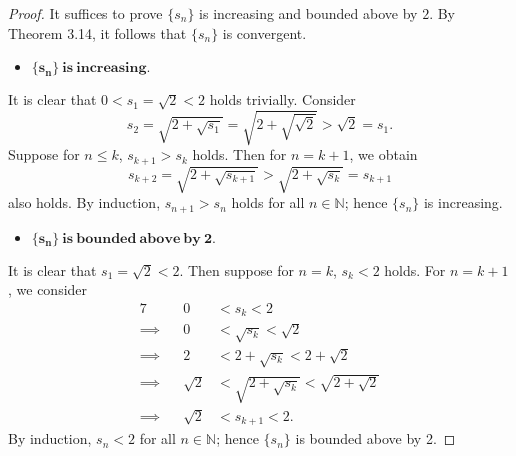 \begin{Exercise}
	\begin{proof}
		It suffices to prove $\{s_n\}$ is increasing and bounded above by $2$. By Theorem 3.14, it follows that $\{s_n\}$ is convergent.
		
		\begin{itemize}
			\item $\mathbf{\{s_n\}\ is\ increasing.}$ 
		\end{itemize}
		It is clear that $0<s_1=\sqrt{2}<2$ holds trivially.
		Consider
		$$
		s_2 = \sqrt{2+\sqrt{s_1}} = \sqrt{2+\sqrt{\sqrt{2}}} > \sqrt{2} = s_1.
		$$
		Suppose for $n\leq k$, $s_{k+1}>s_k$ holds. Then for $n = k+1$, we obtain
		$$
		s_{k+2} = \sqrt{2+\sqrt{s_{k+1}}} > \sqrt{2+\sqrt{s_k}} = s_{k+1}
		$$
		also holds. By induction, $s_{n+1}>s_n$ holds for all $n\in\mathbb{N}$; hence $\{s_n\}$ is increasing.
		
		\begin{itemize}
			\item $\mathbf{\{s_n\}\ is\ bounded\ above\ by\ 2.}$ 
		\end{itemize}
		It is clear that $s_1 = \sqrt{2} < 2$. Then suppose for $n=k$, $s_k < 2$ holds. For $n=k+1$, we consider
		\begin{alignat*}{7}
		\quad&& 0 &<s_k<2 \\
		\implies&& 0 &< \sqrt{s_k} < \sqrt{2} \\
		\implies&& 2 &< 2+\sqrt{s_k} < 2+\sqrt{2} \\
		\implies&& \sqrt{2} &< \sqrt{2+\sqrt{s_k}} < \sqrt{2+\sqrt{2}} \\
		\implies&& \sqrt{2} &< s_{k+1} < 2.
		\end{alignat*}
		By induction, $s_n<2$ for all $n\in\mathbb{N}$; hence $\{s_n\}$ is bounded above by 2.
	\end{proof}
\end{Exercise}